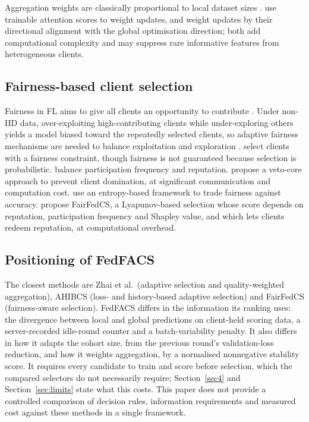 \documentclass[pdflatex,sn-basic]{sn-jnl}
\begin{document}
Aggregation weights are classically proportional to local dataset sizes \citep{ayeelyan2025,zhai2024}. \citet{ji2019} use trainable attention scores to weight updates, and \citet{wu2021} weight updates by their directional alignment with the global optimisation direction; both add computational complexity and may suppress rare informative features from heterogeneous clients.

\subsection{Fairness-based client selection}
Fairness in FL aims to give all clients an opportunity to contribute \citep{huang2024}. Under non-IID data, over-exploiting high-contributing clients while under-exploring others yields a model biased toward the repeatedly selected clients, so adaptive fairness mechanisms are needed to balance exploitation and exploration \citep{bouzamoucha2025,mukhtiar2025a,mukhtiar2025b,zhang2022}. \citet{huang2020} select clients with a fairness constraint, though fairness is not guaranteed because selection is probabilistic. \citet{song2022} balance participation frequency and reputation. \citet{chaudhury2024} propose a veto-core approach to prevent client domination, at significant communication and computation cost. \citet{wang2023} use an entropy-based framework to trade fairness against accuracy. \citet{shi2023} propose FairFedCS, a Lyapunov-based selection whose score depends on reputation, participation frequency and Shapley value, and which lets clients redeem reputation, at computational overhead.

\subsection{Positioning of FedFACS}
The closest methods are Zhai et al.\ (adaptive selection and quality-weighted aggregation), AHIBCS (loss- and history-based adaptive selection) and FairFedCS (fairness-aware selection). FedFACS differs in the information its ranking uses: the divergence between local and global predictions on client-held scoring data, a server-recorded idle-round counter and a batch-variability penalty. It also differs in how it adapts the cohort size, from the previous round's validation-loss reduction, and how it weights aggregation, by a normalised nonnegative stability score. It requires every candidate to train and score before selection, which the compared selectors do not necessarily require; Section~\ref{sec4} and Section~\ref{sec:limits} state what this costs. This paper does not provide a controlled comparison of decision rules, information requirements and measured cost against these methods in a single framework.
\end{document}
